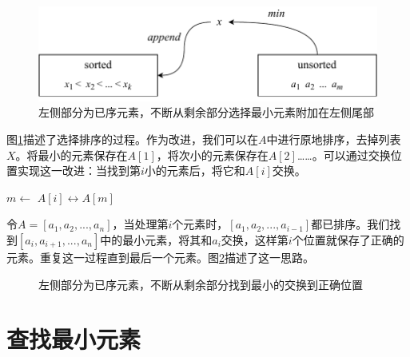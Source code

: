 \documentclass[b5paper]{ctexart}
\begin{document}
\begin{figure}[htbp]
  \centering
  \includegraphics[scale=0.8]{img/ssort}
  \caption{左侧部分为已序元素，不断从剩余部分选择最小元素附加在左侧尾部}
  \label{fig:sel-sort}
\end{figure}

图\ref{fig:sel-sort}描述了选择排序的过程。作为改进，我们可以在$A$中进行原地排序，去掉列表$X$。将最小的元素保存在$A[1]$，将次小的元素保存在$A[2]$……。可以通过交换位置实现这一改进：当找到第$i$小的元素后，将它和$A[i]$交换。

\begin{algorithmic}[1]
    \State $m \gets$ 
    \State {} $A[i] \leftrightarrow A[m]$
  \EndFor
\EndFunction
\end{algorithmic}

令$A = [a_1, a_2, ..., a_n]$，当处理第$i$个元素时，$[a_1, a_2, ..., a_{i-1}]$都已排序。我们找到$[a_i, a_{i+1}, ..., a_n]$中的最小元素，将其和$a_i$交换，这样第$i$个位置就保存了正确的元素。重复这一过程直到最后一个元素。图\ref{fig:in-place-ssort}描述了这一思路。

\begin{figure}[htbp]
  \centering
  \caption{左侧部分为已序元素，不断从剩余部分找到最小的交换到正确位置}
  \label{fig:in-place-ssort}
\end{figure}

\section{查找最小元素}
\end{document}
